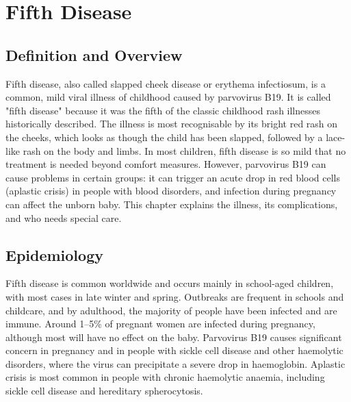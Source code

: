 \chapter{Fifth Disease}

\section*{Definition and Overview}
Fifth disease, also called slapped cheek disease or erythema infectiosum, is a common, mild viral illness of childhood caused by parvovirus B19. It is called "fifth disease" because it was the fifth of the classic childhood rash illnesses historically described. The illness is most recognisable by its bright red rash on the cheeks, which looks as though the child has been slapped, followed by a lace-like rash on the body and limbs. In most children, fifth disease is so mild that no treatment is needed beyond comfort measures. However, parvovirus B19 can cause problems in certain groups: it can trigger an acute drop in red blood cells (aplastic crisis) in people with blood disorders, and infection during pregnancy can affect the unborn baby. This chapter explains the illness, its complications, and who needs special care.

\section*{Epidemiology}
Fifth disease is common worldwide and occurs mainly in school-aged children, with most cases in late winter and spring. Outbreaks are frequent in schools and childcare, and by adulthood, the majority of people have been infected and are immune. Around 1--5\% of pregnant women are infected during pregnancy, although most will have no effect on the baby. Parvovirus B19 causes significant concern in pregnancy and in people with sickle cell disease and other haemolytic disorders, where the virus can precipitate a severe drop in haemoglobin. Aplastic crisis is most common in people with chronic haemolytic anaemia, including sickle cell disease and hereditary spherocytosis.

